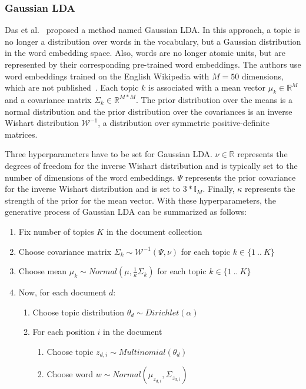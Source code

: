 \documentclass[
        a4paper,
        titlepage,
        twoside,
        parskip,
        numbers=noenddot
        ]{scrbook}
\theoremstyle{break}
\begin{document}
\subsubsection{Gaussian LDA}
Das et al.~\cite{Das2015} proposed a method named Gaussian LDA.
In this approach, a topic is no longer a distribution over words in the vocabulary, but a Gaussian distribution in the word embedding space.
Also, words are no longer atomic units, but are represented by their corresponding pre-trained word embeddings.
The authors use word embeddings trained on the English Wikipedia with $M=50$ dimensions, which are not published~\cite{Das2016}.
Each topic $k$ is associated with a mean vector $\mu_k \in \mathbb{R}^{M}$ and a  covariance matrix $\Sigma_k \in \mathbb{R}^{M * M}$.
The prior distribution over the means is a normal distribution and the prior distribution over the covariances is an inverse Wishart distribution $\mathcal{W}^{-1}$, a distribution over symmetric positive-definite matrices.

Three hyperparameters have to be set for Gaussian LDA.
$\nu \in \mathbb{R}$ represents the degrees of freedom for the inverse Wishart distribution and is typically set to the number of dimensions of the word embeddings.
$\Psi$ represents the prior covariance for the inverse Wishart distribution and is set to $3 * \mathbb{I}_M$.
Finally, $\kappa$ represents the strength of the prior for the mean vector.
With these hyperparameters, the generative process of Gaussian LDA can be summarized as follows:
\begin{enumerate}
       \item Fix number of topics $K$ in the document collection
       \item Choose covariance matrix $\Sigma_k \sim \mathcal{W}^{-1}(\Psi, \nu)$ for each topic $k \in \{1~..~K\}$
       \item Choose mean $\mu_k \sim Normal(\mu, \frac{1}{\kappa} \Sigma_k)$ for each topic $k \in \{1~..~K\}$
       \item Now, for each document $d$:
       \begin{enumerate}
              \item Choose topic distribution $\theta_d \sim Dirichlet(\alpha)$
              \item For each position $i$ in the document
              \begin{enumerate}
                     \item Choose topic $z_{d,i} \sim Multinomial(\theta_d)$
                     \item Choose word $w \sim Normal(\mu_{z_{d,i}}, \Sigma_{z_{d,i}})$
              \end{enumerate}
       \end{enumerate}
\end{enumerate}
\end{document}
